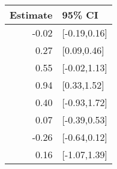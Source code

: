 \begin{tabular}{rl}
  \hline
Estimate & 95\% CI \\ 
  \hline
-0.02 & [-0.19,0.16] \\ 
  0.27 & [0.09,0.46] \\ 
  0.55 & [-0.02,1.13] \\ 
  0.94 & [0.33,1.52] \\ 
  0.40 & [-0.93,1.72] \\ 
  0.07 & [-0.39,0.53] \\ 
  -0.26 & [-0.64,0.12] \\ 
  0.16 & [-1.07,1.39] \\ 
   \hline
\end{tabular}


